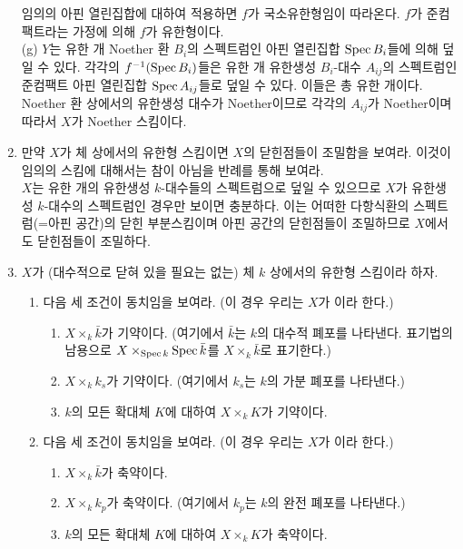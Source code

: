 \begin{enumerate}[label=\tb{3.\arabic*.},itemindent=0mm,itemsep=4mm]
	임의의 아핀 열린집합에 대하여 적용하면 $f$가 국소유한형임이 따라온다. $f$가 준컴팩트라는 가정에 의해 $f$가 유한형이다.\\
	(g) $Y$는 유한 개 Noether 환 $B_i$의 스펙트럼인 아핀 열린집합 $\operatorname{Spec} B_i$들에 의해 덮일 수 있다.
	각각의 $f^{-1}(\operatorname{Spec} B_i)$들은 유한 개 유한생성 $B_i$-대수 $A_{ij}$의 스펙트럼인
	준컴팩트 아핀 열린집합 $\operatorname{Spec} A_{ij}$들로 덮일 수 있다. 이들은 총 유한 개이다.
	Noether 환 상에서의 유한생성 대수가 Noether이므로 각각의 $A_{ij}$가 Noether이며 따라서 $X$가 Noether 스킴이다.
	\item 만약 $X$가 체 상에서의 유한형 스킴이면 $X$의 닫힌점들이 조밀함을 보여라.
	이것이 임의의 스킴에 대해서는 참이 아님을 반례를 통해 보여라.\\
	\sol $X$는 유한 개의 유한생성 $k$-대수들의 스펙트럼으로 덮일 수 있으므로
	$X$가 유한생성 $k$-대수의 스펙트럼인 경우만 보이면 충분하다.
	이는 어떠한 다항식환의 스펙트럼(=아핀 공간)의 닫힌 부분스킴이며 아핀 공간의 닫힌점들이 조밀하므로 $X$에서도 닫힌점들이 조밀하다.
	\item $X$가 (대수적으로 닫혀 있을 필요는 없는) 체 $k$ 상에서의 유한형 스킴이라 하자.
	\begin{enumerate}[label=(\alph*)]
	\item 다음 세 조건이 동치임을 보여라. (이 경우 우리는 $X$가 이라 한다.)\\[-2mm]
	\begin{enumerate}[label=(\roman*)]
	\item $X\times_k\bar k$가 기약이다. (여기에서 $\bar k$는 $k$의 대수적 폐포를 나타낸다.
	표기법의 남용으로 $X\times_{\operatorname{Spec} k}\operatorname{Spec} \bar k$를 $X\times_k\bar k$로 표기한다.)
	\item $X\times_kk_s$가 기약이다. (여기에서 $k_s$는 $k$의 가분 폐포를 나타낸다.)
	\item $k$의 모든 확대체 $K$에 대하여 $X\times_kK$가 기약이다.\\[-2mm]
	\end{enumerate}
	\item 다음 세 조건이 동치임을 보여라. (이 경우 우리는 $X$가 이라 한다.)\\[-2mm]
	\begin{enumerate}[label=(\roman*)]
	\item $X\times_k\bar k$가 축약이다.
	\item $X\times_kk_p$가 축약이다. (여기에서 $k_p$는 $k$의 완전 폐포를 나타낸다.)
	\item $k$의 모든 확대체 $K$에 대하여 $X\times_kK$가 축약이다.\\[-2mm]

\end{enumerate}
\end{enumerate}
\end{enumerate}
